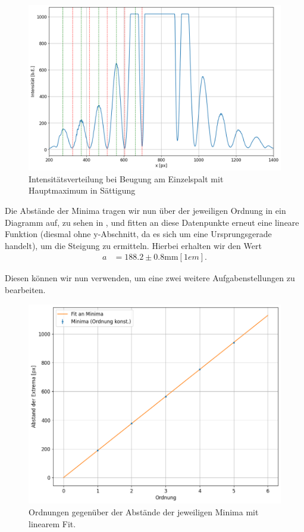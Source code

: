 \begin{figure}[H]
  \centering
  \includegraphics[width=.9\textwidth]{files/plots/2/es_saett_extrema.png}
  \caption{Intensitätsverteilung bei Beugung am Einzelspalt mit Hauptmaximum in Sättigung}
  \label{fig:es_saett_extrema}
\end{figure}

Die Abstände der Minima tragen wir nun über der jeweiligen Ordnung in ein Diagramm auf, zu sehen in , und fitten an diese Datenpunkte erneut eine lineare Funktion (diesmal ohne y-Abschnitt, da es sich um eine Ursprungsgerade handelt), um die Steigung zu ermitteln. Hierbei erhalten wir den Wert
\begin{align}
  a &= 188.2 \pm 0.8 \si{\milli\meter}[1em].
\end{align}

Diesen können wir nun verwenden, um eine zwei weitere Aufgabenstellungen zu bearbeiten.

\begin{figure}[H]
  \centering
  \includegraphics[width=.9\textwidth]{files/plots/2/es_fit_ordnung_ohne_maxima.png}
  \caption{Ordnungen gegenüber der Abstände der jeweiligen Minima mit linearem Fit.}
  \label{fig:es_fit_ordnung_ohne_maxima}
\end{figure}

